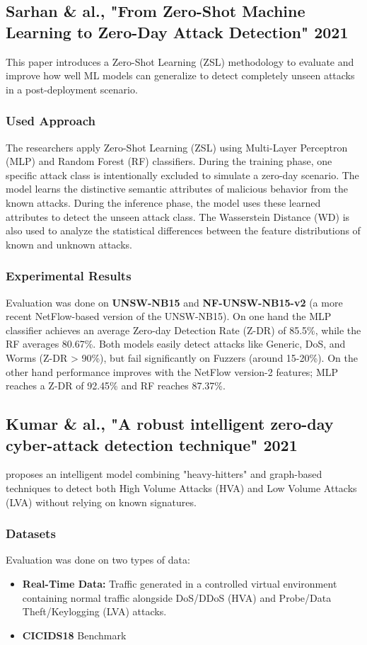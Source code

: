 \documentclass[12pt, a4paper]{report}
\begin{document}
\subsection{Sarhan \& al., "From Zero-Shot Machine Learning to Zero-Day Attack Detection" 2021}
This paper \cite{sarhan2021zeroshot} introduces a Zero-Shot Learning (ZSL) methodology to evaluate and improve how well ML models can generalize to detect completely unseen attacks in a post-deployment scenario.

\subsubsection{Used Approach}
The researchers apply Zero-Shot Learning (ZSL) using Multi-Layer Perceptron (MLP) and Random Forest (RF) classifiers. During the training phase, one specific attack class is intentionally excluded to simulate a zero-day scenario. The model learns the distinctive semantic attributes of malicious behavior from the known attacks. During the inference phase, the model uses these learned attributes to detect the unseen attack class. The Wasserstein Distance (WD) is also used to analyze the statistical differences between the feature distributions of known and unknown attacks.

\subsubsection{Experimental Results}
Evaluation was done on \textbf{UNSW-NB15} and \textbf{NF-UNSW-NB15-v2} (a more recent NetFlow-based version of the UNSW-NB15). On one hand the MLP classifier achieves an average Zero-day Detection Rate (Z-DR) of 85.5\%, while the RF averages 80.67\%. Both models easily detect attacks like Generic, DoS, and Worms (Z-DR > 90\%), but fail significantly on Fuzzers (around 15-20\%). On the other hand performance improves with the NetFlow version-2 features; MLP reaches a Z-DR of 92.45\% and RF reaches 87.37\%.

\subsection{Kumar \& al., "A robust intelligent zero-day cyber-attack detection technique" 2021}
\cite{kumar2021robust} proposes an intelligent model combining "heavy-hitters" and graph-based techniques to detect both High Volume Attacks (HVA) and Low Volume Attacks (LVA) without relying on known signatures.

\subsubsection{Datasets}
Evaluation was done on two types of data:
\begin{itemize}
    \item \textbf{Real-Time Data:} Traffic generated in a controlled virtual environment containing normal traffic alongside DoS/DDoS (HVA) and Probe/Data Theft/Keylogging (LVA) attacks.
    \item \textbf{CICIDS18 } Benchmark
\end{itemize}
\end{document}
